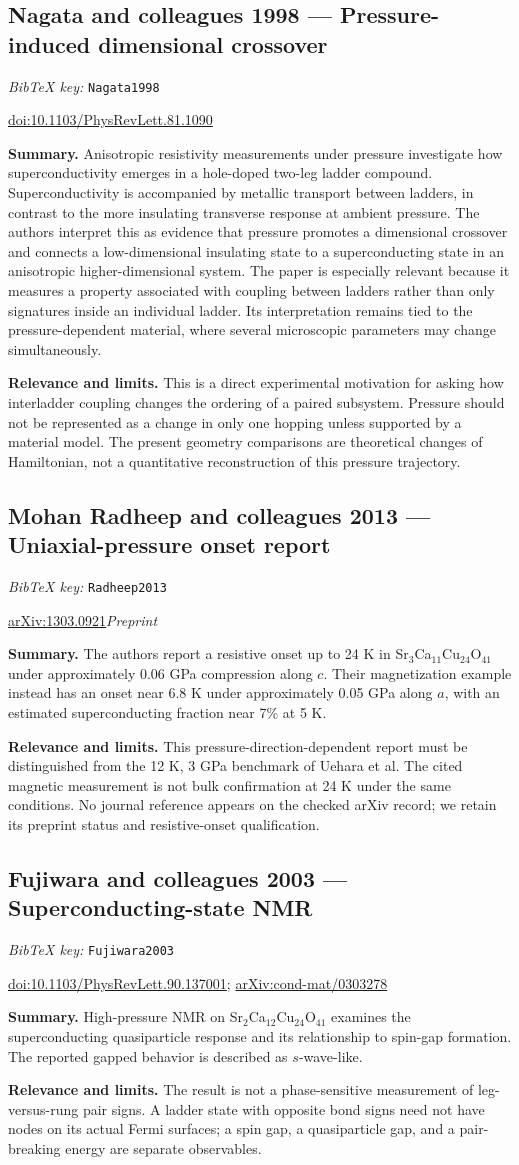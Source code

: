 \documentclass[11pt]{article}
\newcommand{\paper}[2]{\Needspace{8\baselineskip}\subsection{#2}\label{paper:#1}\textit{BibTeX key:} \texttt{#1}\quad\citep{#1}\par}
\newcommand{\doi}[1]{\href{https://doi.org/#1}{doi:#1}}
\newcommand{\arxiv}[1]{\href{https://arxiv.org/abs/#1}{arXiv:#1}}
\newcommand{\summary}{\par\textbf{Summary.} }
\newcommand{\relevance}{\par\textbf{Relevance and limits.} }
\begin{document}
\paper{Nagata1998}{Nagata and colleagues 1998 --- Pressure-induced dimensional crossover}
\doi{10.1103/PhysRevLett.81.1090}
\summary Anisotropic resistivity measurements under pressure investigate how superconductivity emerges in a hole-doped two-leg ladder compound. Superconductivity is accompanied by metallic transport between ladders, in contrast to the more insulating transverse response at ambient pressure. The authors interpret this as evidence that pressure promotes a dimensional crossover and connects a low-dimensional insulating state to a superconducting state in an anisotropic higher-dimensional system. The paper is especially relevant because it measures a property associated with coupling between ladders rather than only signatures inside an individual ladder. Its interpretation remains tied to the pressure-dependent material, where several microscopic parameters may change simultaneously.
\relevance This is a direct experimental motivation for asking how interladder coupling changes the ordering of a paired subsystem. Pressure should not be represented as a change in only one hopping unless supported by a material model. The present geometry comparisons are theoretical changes of Hamiltonian, not a quantitative reconstruction of this pressure trajectory.

\paper{Radheep2013}{Mohan Radheep and colleagues 2013 --- Uniaxial-pressure onset report}
\arxiv{1303.0921}\quad\textit{Preprint}
\summary The authors report a resistive onset up to 24 K in Sr$_3$Ca$_{11}$Cu$_{24}$O$_{41}$ under approximately 0.06 GPa compression along $c$. Their magnetization example instead has an onset near 6.8 K under approximately 0.05 GPa along $a$, with an estimated superconducting fraction near 7\% at 5 K.
\relevance This pressure-direction-dependent report must be distinguished from the 12 K, 3 GPa benchmark of Uehara et al. The cited magnetic measurement is not bulk confirmation at 24 K under the same conditions. No journal reference appears on the checked arXiv record; we retain its preprint status and resistive-onset qualification.

\paper{Fujiwara2003}{Fujiwara and colleagues 2003 --- Superconducting-state NMR}
\doi{10.1103/PhysRevLett.90.137001}; \arxiv{cond-mat/0303278}
\summary High-pressure NMR on Sr$_2$Ca$_{12}$Cu$_{24}$O$_{41}$ examines the superconducting quasiparticle response and its relationship to spin-gap formation. The reported gapped behavior is described as $s$-wave-like.
\relevance The result is not a phase-sensitive measurement of leg-versus-rung pair signs. A ladder state with opposite bond signs need not have nodes on its actual Fermi surfaces; a spin gap, a quasiparticle gap, and a pair-breaking energy are separate observables.
\end{document}
